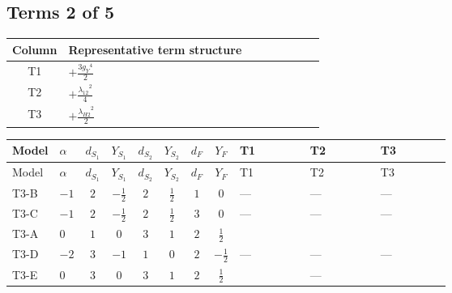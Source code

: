 \documentclass[8pt]{article}
\begin{document}
\begin{landscape}
\subsection*{Terms 2 of 5}
\begin{center}
\begin{tabular}{@{}c >{\raggedright\arraybackslash}p{0.82\linewidth}@{}}
\toprule
Column & Representative term structure \\
\midrule
T1 & \(\displaystyle +\frac{3 {g_Y}^4}{2}\) \\
\midrule
T2 & \(\displaystyle +\frac{{\lambda_{12}}^2}{4}\) \\
\midrule
T3 & \(\displaystyle +\frac{{\lambda_{H2}}^2}{2}\) \\
\midrule
\bottomrule
\end{tabular}
\end{center}
\smallskip
\tiny
\begin{longtable}{@{}llcccccc >{\raggedright\arraybackslash}p{0.21\linewidth} >{\raggedright\arraybackslash}p{0.21\linewidth} >{\raggedright\arraybackslash}p{0.21\linewidth}@{}}
\toprule
Model & $\alpha$ & $d_{S_1}$ & $Y_{S_1}$ & $d_{S_2}$ & $Y_{S_2}$ & $d_F$ & $Y_F$ & T1 & T2 & T3 \\
\midrule
\endfirsthead
\toprule
Model & $\alpha$ & $d_{S_1}$ & $Y_{S_1}$ & $d_{S_2}$ & $Y_{S_2}$ & $d_F$ & $Y_F$ & T1 & T2 & T3 \\
\midrule
\endhead
T3-B & $-1$ & $2$ & $-\frac{1}{2}$ & $2$ & $\frac{1}{2}$ & $1$ & $0$ & --- & --- & --- \\
\midrule
T3-C & $-1$ & $2$ & $-\frac{1}{2}$ & $2$ & $\frac{1}{2}$ & $3$ & $0$ & --- & --- & --- \\
\midrule
T3-A & $0$ & $1$ & $0$ & $3$ & $1$ & $2$ & $\frac{1}{2}$ & \scriptsize\adjustbox{max width=\linewidth}{$\begin{gathered} +\frac{3 {g_Y}^4}{2}\end{gathered}$} & \scriptsize\adjustbox{max width=\linewidth}{$\begin{gathered} +\frac{{\lambda_{12}}^2}{4}\end{gathered}$} & \scriptsize\adjustbox{max width=\linewidth}{$\begin{gathered} +\frac{{\lambda_{H2}}^2}{2}\end{gathered}$} \\
\midrule
T3-D & $-2$ & $3$ & $-1$ & $1$ & $0$ & $2$ & $-\frac{1}{2}$ & --- & --- & --- \\
\midrule
T3-E & $0$ & $3$ & $0$ & $3$ & $1$ & $2$ & $\frac{1}{2}$ & \scriptsize\adjustbox{max width=\linewidth}{$\begin{gathered} +\frac{3 {g_Y}^4}{2}\end{gathered}$} & --- & \scriptsize\adjustbox{max width=\linewidth}{$\begin{gathered} +\frac{{\lambda_{H2}}^2}{2}\end{gathered}$} \\
\midrule
\bottomrule
\end{longtable}
\clearpage

\end{landscape}
\end{document}
